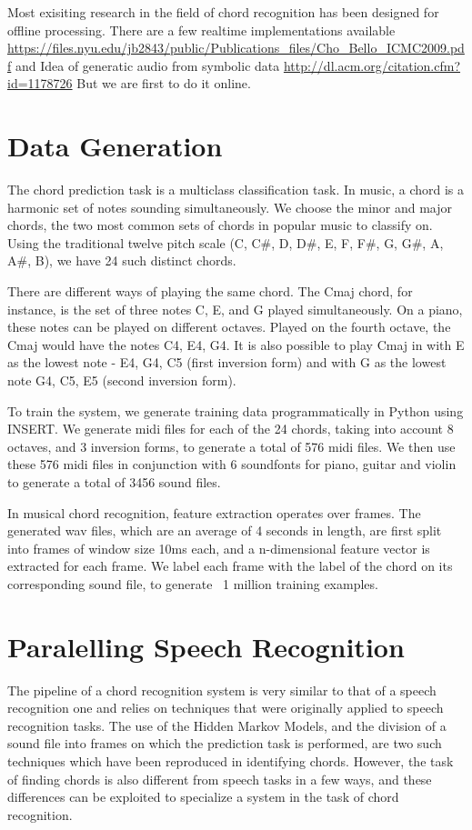 \documentclass{article}
\begin{document}
Most exisiting research in the field of chord recognition has been designed for offline processing. There are a few realtime implementations available \url{https://files.nyu.edu/jb2843/public/Publications_files/Cho_Bello_ICMC2009.pdf} and  Idea of generatic audio from symbolic data \url{http://dl.acm.org/citation.cfm?id=1178726}
But we are first to do it online.

\section{Data Generation}
The chord prediction task is a multiclass classification task. In music, a chord is a harmonic set of notes sounding simultaneously. We choose the minor and major chords, the two most common sets of chords in popular music to classify on. Using the traditional twelve pitch scale (C, C\#, D, D\#, E, F, F\#, G, G\#, A, A\#, B), we have 24 such distinct chords.

There are different ways of playing the same chord. The Cmaj chord, for instance, is the set of three notes C, E, and G played simultaneously. On a piano, these notes can be played on different octaves. Played on the fourth octave, the Cmaj would have the notes C4, E4, G4. It is also possible to play Cmaj in with E as the lowest note - E4, G4, C5 (first inversion form) and with G as the lowest note G4, C5, E5 (second inversion form).

To train the system, we generate training data programmatically in Python using INSERT. We generate midi files for each of the 24 chords, taking into account 8 octaves, and 3 inversion forms, to generate a total of 576 midi files. We then use these 576 midi files in conjunction with 6 soundfonts for piano, guitar and violin to generate a total of 3456 sound files.

In musical chord recognition, feature extraction operates over frames. The generated wav files, which are an average of 4 seconds in length, are first split into frames of window size 10ms each, and a n-dimensional feature vector is extracted for each frame. We label each frame with the label of the chord on its corresponding sound file, to generate ~1 million training examples.

\section{Paralelling Speech Recognition}

The pipeline of a chord recognition system is very similar to that of a speech recognition one and relies on techniques that were originally applied to speech recognition tasks. The use of the Hidden Markov Models, and the division of a sound file into frames on which the prediction task is performed, are two such techniques which have been reproduced in identifying chords. However, the task of finding chords is also different from speech tasks in a few ways, and these differences can be exploited to specialize a system in the task of chord recognition.
\end{document}
